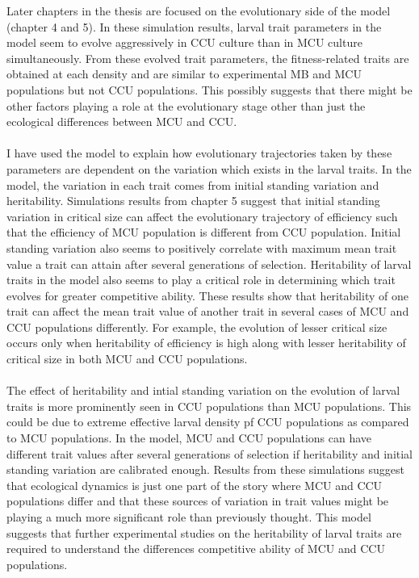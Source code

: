 Later chapters in the thesis are focused on the evolutionary side of the model (chapter 4 and 5). In these simulation results, larval trait parameters in the model seem to evolve aggressively in CCU culture than in MCU culture simultaneously. From these evolved trait parameters, the fitness-related traits are obtained at each density and are similar to experimental MB and MCU populations but not CCU populations. This possibly suggests that there might be other factors playing a role at the evolutionary stage other than just the ecological differences between MCU and CCU. \\\\
I have used the model to explain how evolutionary trajectories taken by these parameters are dependent on the variation which exists in the larval traits. In the model, the variation in each trait comes from initial standing variation and heritability. Simulations results from chapter 5 suggest that initial standing variation in critical size can affect the evolutionary trajectory of efficiency such that the efficiency of MCU population is different from CCU population. Initial standing variation also seems to positively correlate with maximum mean trait value a trait can attain after several generations of selection. Heritability of larval traits in the model also seems to play a critical role in determining which trait evolves for greater competitive ability. These results show that heritability of one trait can affect the mean trait value of another trait in several cases of MCU and CCU populations differently. For example, the evolution of lesser critical size occurs only when heritability of efficiency is high along with lesser heritability of critical size in both MCU and CCU populations. \\\\
The effect of heritability and intial standing variation on the evolution of larval traits is more prominently seen in CCU populations than MCU populations. This could be due to extreme effective larval density pf CCU populations as compared to MCU populations. In the model, MCU and CCU populations can have different trait values after several generations of selection if heritability and initial standing variation are calibrated enough. Results from these simulations suggest that ecological dynamics is just one part of the story where MCU and CCU populations differ and that these sources of variation in trait values might be playing a much more significant role than previously thought. This model suggests that further experimental studies on the heritability of larval traits are required to understand the differences competitive ability of MCU and CCU populations.\\\\
